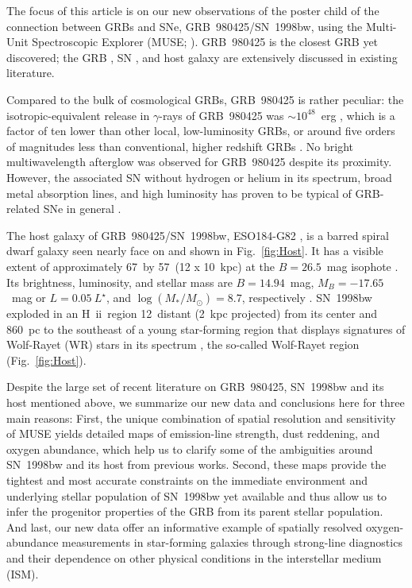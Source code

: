 \documentclass[traditabstract]{aa}
\newcommand{\hii}{\mbox{H~{\sc ii}}}
\begin{document}
The focus of this article is on our new observations of the poster child of the connection between GRBs and SNe, GRB~980425/SN~1998bw, using the Multi-Unit Spectroscopic Explorer (MUSE; \citealp{2010SPIE.7735E..08B}). GRB~980425 is the closest GRB yet discovered; the GRB \citep[e.g.,][]{1998Natur.395..670G, 1998Natur.395..663K}, SN \citep[e.g.,][]{1998Natur.395..672I, 2001ApJ...555..900P, 2006ApJ...640..854M}, and host galaxy \citep[e.g.,][]{2000ApJ...542L..89F, 2005NewA...11..103S, 2006A&A...454..103H, 2009ApJ...693..347M, 2014A&A...562A..70M, 2016arXiv160901742M, 2012ApJ...746....7L, 2015MNRAS.454L..51A} are extensively discussed in existing literature. 

Compared to the bulk of cosmological GRBs, GRB~980425 is rather peculiar: the isotropic-equivalent release in $\gamma$-rays of GRB~980425 was $\sim10^{48}$~erg \citep{1998Natur.395..670G}, which is a factor of ten lower than other local, low-luminosity GRBs, or around five orders of magnitudes less than conventional, higher redshift GRBs \citep{2013ApJ...776...98X}. No bright multiwavelength afterglow was observed for GRB~980425 despite its proximity. However, the associated SN without hydrogen or helium in its spectrum, broad metal absorption lines, and high luminosity has proven to be typical of GRB-related SNe in general \citep{2012grbu.book..169H}.

The host galaxy of GRB~980425/SN~1998bw, ESO184-G82 \citep{1989spce.book.....L}, is a barred spiral dwarf galaxy \citep{2000ApJ...542L..89F} seen nearly face on and shown in Fig.~\ref{fig:Host}. It has a visible {extent} of approximately 67\arcsec~by 57\arcsec~(12 x 10~kpc) at the $B=26.5$~mag isophote \citep{2005NewA...11..103S}. Its brightness, luminosity, and stellar mass are $B=14.94$~mag, $M_B=-17.65$~mag or $L=0.05~{L}^{\star}$, and $\log (M_{*}/M_{\odot})= 8.7 $, respectively \citep{2005NewA...11..103S, 2014A&A...562A..70M}. SN~1998bw exploded in an \hii~region 12\arcsec\ distant (2~kpc projected) from its center and 860~pc to the southeast of a young star-forming region that displays signatures of Wolf-Rayet (WR) stars in its spectrum \citep{2006A&A...454..103H}, the so-called Wolf-Rayet region (Fig.~\ref{fig:Host}).

Despite the large set of recent literature on GRB~980425, SN~1998bw and its host mentioned above, we summarize our new data and conclusions here for three main reasons: First, the unique combination of spatial resolution and sensitivity of MUSE yields detailed maps of emission-line strength, dust reddening, and oxygen abundance, which help us to clarify some of the ambiguities around SN~1998bw and its host from previous works. Second, these maps provide the tightest and most accurate constraints on the immediate environment and underlying stellar population of SN~1998bw yet available and thus allow us to infer the progenitor properties of the GRB from its parent stellar population. And last, our new data offer an informative example of spatially resolved oxygen-abundance measurements in star-forming galaxies through strong-line diagnostics and their dependence on other physical conditions in the interstellar medium (ISM).
\end{document}
